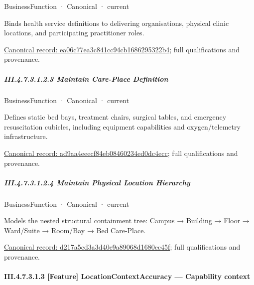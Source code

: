 \label{element:ea06c77ea3c841cc94cb1686295322b4}
{\small BusinessFunction · Canonical · current}\par

Binds health service definitions to delivering organisations, physical clinic locations, and participating practitioner roles.


{\footnotesize \href{../../../../continuum/business/business-function/ea06c77ea3c841cc94cb1686295322b4.md}{Canonical record: ea06c77ea3c841cc94cb1686295322b4}; full qualifications and provenance.}\par
\subparagraph*{III.4.7.3.1.2.3 Maintain Care-Place Definition}
\label{navigation:III.4.7.3.1.2.3}

\label{element:ad9aa4eeecf84eb08460234ed0dc4ecc}
{\small BusinessFunction · Canonical · current}\par

Defines static bed bays, treatment chairs, surgical tables, and emergency resuscitation cubicles, including equipment capabilities and oxygen/telemetry infrastructure.


{\footnotesize \href{../../../../continuum/business/business-function/ad9aa4eeecf84eb08460234ed0dc4ecc.md}{Canonical record: ad9aa4eeecf84eb08460234ed0dc4ecc}; full qualifications and provenance.}\par
\subparagraph*{III.4.7.3.1.2.4 Maintain Physical Location Hierarchy}
\label{navigation:III.4.7.3.1.2.4}

\label{element:d217a5cd3a3d40e9a89068d1680ec45f}
{\small BusinessFunction · Canonical · current}\par

Models the nested structural containment tree: Campus → Building → Floor → Ward/Suite → Room/Bay → Bed Care-Place.


{\footnotesize \href{../../../../continuum/business/business-function/d217a5cd3a3d40e9a89068d1680ec45f.md}{Canonical record: d217a5cd3a3d40e9a89068d1680ec45f}; full qualifications and provenance.}\par
\paragraph*{III.4.7.3.1.3 [Feature] LocationContextAccuracy — Capability context}
\label{navigation:III.4.7.3.1.3}

